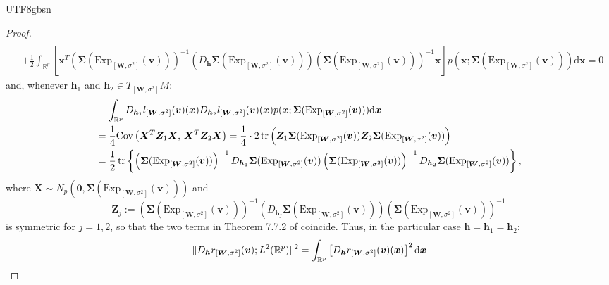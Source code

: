 \documentclass[12pt]{report}
\newcommand\tab[1][1cm]{\hspace*{#1}}
\newcommand{\bracket}[1]{\left ( #1 \right )}
\newcommand{\curly}[1]{\left \{ #1 \right \} }
\newcommand{\squared}[1]{\left [ #1 \right ]}
\theoremstyle{plain}
\theoremstyle{definition}
\begin{document}
\begin{CJK*}{UTF8}{gbsn}
\begin{proof}
\begin{equation*}
\begin{split}
  \\ & + \frac{1}{2}\int_{\mathbb{R}^p}\squared{\bm{x}^T\bracket{\bm{\Sigma}(\text{Exp}_{[\bm{W},\sigma^2]}(\bm{v}))}^{-1}
  \bracket{D_{\bm{h}}\bm{\Sigma}(\text{Exp}_{[\bm{W},\sigma^2]}(\bm{v}))}
  \bracket{\bm{\Sigma}(\text{Exp}_{[\bm{W},\sigma^2]}(\bm{v}))}^{-1}\bm{x}} 
  p(\bm{x}; \bm{\Sigma}(\text{Exp}_{[\bm{W},\sigma^2]}(\bm{v})))\mathrm{d} \bm{x} = 0
  \end{split}
\end{equation*} 
and, whenever $\bm{h}_1$ and $\bm{h}_2 \in T_{[\bm{W},\sigma^2]}M$:
\begin{equation}\label{eq:fisher_computation}
  \begin{split}
  & \tab[0.4cm] 	
   \int_{\mathbb{R}^p} D_{\bm{h}_1}l_{[\bm{W},\sigma^2]}(\bm{v})(\bm{x})
   D_{\bm{h}_2}l_{[\bm{W},\sigma^2]}(\bm{v})(\bm{x})
  p(\bm{x}; \bm{\Sigma}(\text{Exp}_{[\bm{W},\sigma^2]}(\bm{v})))\mathrm{d} \bm{x}
  \\ & = \frac{1}{4}\text{Cov}\bracket{\bm{X}^T\bm{Z}_1\bm{X}, \, \bm{X}^T\bm{Z}_2\bm{X}}
  = \frac{1}{4} \cdot 2 \tr \bracket{\bm{Z}_1 \bm{\Sigma}(\text{Exp}_{[\bm{W},\sigma^2]}(\bm{v}))
  \bm{Z}_2 \bm{\Sigma}(\text{Exp}_{[\bm{W},\sigma^2]}(\bm{v}))}
  \\ & = \frac{1}{2}\tr \curly{\bracket{\bm{\Sigma}(\text{Exp}_{[\bm{W},\sigma^2]}(\bm{v}))}^{-1}
  D_{\bm{h}_1}\bm{\Sigma}(\text{Exp}_{[\bm{W},\sigma^2]}(\bm{v}))
  \bracket{\bm{\Sigma}(\text{Exp}_{[\bm{W},\sigma^2]}(\bm{v}))}^{-1}
  D_{\bm{h}_2}\bm{\Sigma}(\text{Exp}_{[\bm{W},\sigma^2]}(\bm{v}))},
  \end{split}
\end{equation}
where $\bm{X} \sim N_p(\bm{0}, \bm{\Sigma}(\text{Exp}_{[\bm{W},\sigma^2]}(\bm{v})))$ and
\begin{equation}\label{eq:Z_j_def}
  \bm{Z}_j := \bracket{\bm{\Sigma}(\text{Exp}_{[\bm{W},\sigma^2]}(\bm{v}))}^{-1}
  \bracket{D_{\bm{h}_j}\bm{\Sigma}(\text{Exp}_{[\bm{W},\sigma^2]}(\bm{v}))}
  \bracket{\bm{\Sigma}(\text{Exp}_{[\bm{W},\sigma^2]}(\bm{v}))}^{-1}
\end{equation}
is symmetric for $j=1,2$, so that the two terms in Theorem 7.7.2
of \cite{Gupta_Nagar_2000} coincide.
Thus, in the particular case $\bm{h} = \bm{h}_1 = \bm{h}_2$:
\begin{equation}\label{eq:r_L2norm}
  \begin{split}
  & \tab[0.4cm] 	\|D_{\bm{h}}r_{[\bm{W},\sigma^2]}(\bm{v});L^2(\mathbb{R}^p)	\|^{2} =
  \int_{\mathbb{R}^p} \squared{D_{\bm{h}}r_{[\bm{W},\sigma^2]}(\bm{v})(\bm{x})}^2 \mathrm{d} \bm{x}

\end{split}
\end{equation}
\end{proof}
\end{CJK*}
\end{document}
